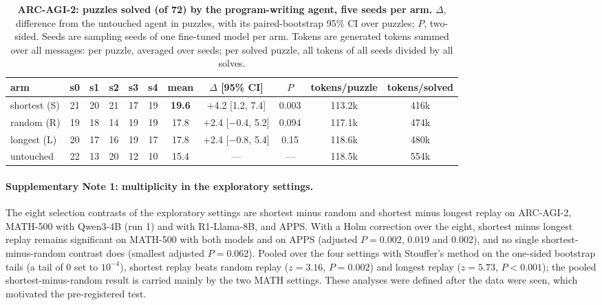 \documentclass[10pt]{article}
\begin{document}
\begin{table}[h]
\centering\small
\caption{\textbf{ARC-AGI-2: puzzles solved (of 72) by the program-writing agent, five seeds per arm.} $\Delta$, difference from the untouched agent in puzzles, with its paired-bootstrap 95\% CI over puzzles; $P$, two-sided. Seeds are sampling seeds of one fine-tuned model per arm. Tokens are generated tokens summed over all messages: per puzzle, averaged over seeds; per solved puzzle, all tokens of all seeds divided by all solves.}
\label{tab:arc}
\setlength{\tabcolsep}{4.2pt}
\begin{tabular}{lcccccccccc}
\toprule
arm & s0 & s1 & s2 & s3 & s4 & mean & $\Delta$ [95\% CI] & $P$ & tokens/puzzle & tokens/solved \\
\midrule
shortest (S) & 21 & 20 & 21 & 17 & 19 & \textbf{19.6} & $+$4.2 [1.2, 7.4] & 0.003 & 113.2k & 416k \\
random (R) & 19 & 18 & 14 & 19 & 19 & 17.8 & $+$2.4 [$-$0.4, 5.2] & 0.094 & 117.1k & 474k \\
longest (L) & 20 & 17 & 16 & 19 & 17 & 17.8 & $+$2.4 [$-$0.8, 5.4] & 0.15 & 118.6k & 480k \\
untouched & 22 & 13 & 20 & 12 & 10 & 15.4 & --- & --- & 118.5k & 554k \\
\bottomrule
\end{tabular}
\end{table}

\paragraph{Supplementary Note 1: multiplicity in the exploratory settings.} The eight selection contrasts of the exploratory settings are shortest minus random and shortest minus longest replay on ARC-AGI-2, MATH-500 with Qwen3-4B (run 1) and with R1-Llama-8B, and APPS. With a Holm correction over the eight, shortest minus longest replay remains significant on MATH-500 with both models and on APPS (adjusted $P=0.002$, 0.019 and 0.002), and no single shortest-minus-random contrast does (smallest adjusted $P=0.062$). Pooled over the four settings with Stouffer's method on the one-sided bootstrap tails (a tail of 0 set to $10^{-4}$), shortest replay beats random replay ($z=3.16$, $P=0.002$) and longest replay ($z=5.73$, $P<0.001$); the pooled shortest-minus-random result is carried mainly by the two MATH settings. These analyses were defined after the data were seen, which motivated the pre-registered test.
\end{document}
